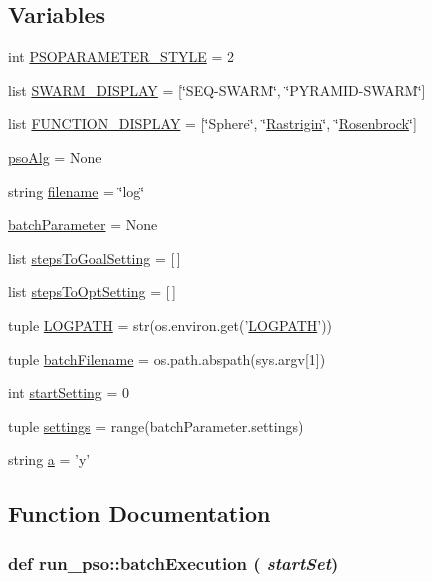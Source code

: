 \subsection*{Variables}
\begin{CompactItemize}
\item 
int \hyperlink{namespacerun__pso_26666bbfc1f7ff2946e8d188dfac7428}{PSOPARAMETER\_\-STYLE} = 2
\item 
list \hyperlink{namespacerun__pso_13cf63525e65585d452649b7ede35473}{SWARM\_\-DISPLAY} = \mbox{[}\char`\"{}SEQ-SWARM\char`\"{}, \char`\"{}PYRAMID-SWARM\char`\"{}\mbox{]}
\item 
list \hyperlink{namespacerun__pso_282736b723eff4e6a6abb2e88cfe168e}{FUNCTION\_\-DISPLAY} = \mbox{[}\char`\"{}Sphere\char`\"{}, \char`\"{}\hyperlink{classRastrigin}{Rastrigin}\char`\"{}, \char`\"{}\hyperlink{classRosenbrock}{Rosenbrock}\char`\"{}\mbox{]}
\item 
\hyperlink{namespacerun__pso_2f4a1650b61fc98aaa1474f8e6631576}{psoAlg} = None
\item 
string \hyperlink{namespacerun__pso_4b57080cd7d11065fe404d7d6dd182a1}{filename} = \char`\"{}log\char`\"{}
\item 
\hyperlink{namespacerun__pso_67b81a80e48c592be44a6e4a2db0a269}{batchParameter} = None
\item 
list \hyperlink{namespacerun__pso_23deae49a95629b541d9a3778f51bdc6}{stepsToGoalSetting} = \mbox{[}$\,$\mbox{]}
\item 
list \hyperlink{namespacerun__pso_e4ac6b9de35b72adc7a9754b3340e5b7}{stepsToOptSetting} = \mbox{[}$\,$\mbox{]}
\item 
tuple \hyperlink{namespacerun__pso_d0daedc626a37bceecf7e1fbf606745e}{LOGPATH} = str(os.environ.get('\hyperlink{namespacerun__pso_d0daedc626a37bceecf7e1fbf606745e}{LOGPATH}'))
\item 
tuple \hyperlink{namespacerun__pso_0a19a9c4b6d7295cdcaa2091daa6037b}{batchFilename} = os.path.abspath(sys.argv\mbox{[}1\mbox{]})
\item 
int \hyperlink{namespacerun__pso_52030e9fb4d89dac00b30077913c9865}{startSetting} = 0
\item 
tuple \hyperlink{namespacerun__pso_afcb884aafce4dc8868b132676c64b3b}{settings} = range(batchParameter.settings)
\item 
string \hyperlink{namespacerun__pso_1068caf66dddb9aea4f3b251202394fa}{a} = 'y'
\end{CompactItemize}


\subsection{Function Documentation}
\hypertarget{namespacerun__pso_6d7c6c31447f5d6497091e17995130e0}{
\subsubsection{\setlength{\rightskip}{0pt plus 5cm}def run\_\-pso::batchExecution ( {\em startSet})}}
\label{namespacerun__pso_6d7c6c31447f5d6497091e17995130e0}


